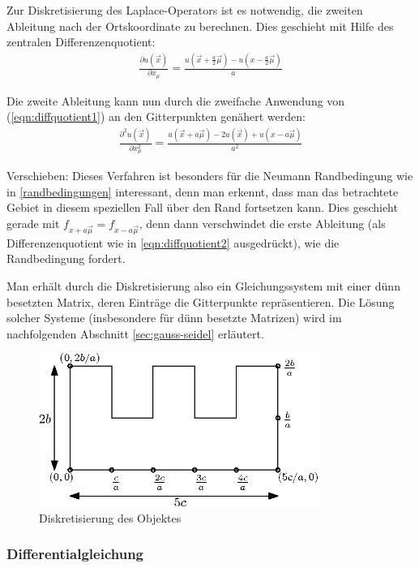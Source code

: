 \documentclass[10pt,a4paper]{article}
\begin{document}
Zur Diskretisierung des Laplace-Operators ist es notwendig, die zweiten Ableitung nach der Ortskoordinate zu berechnen. Dies geschieht mit Hilfe des zentralen Differenzenquotient:
\begin{align}
\frac{\partial u(\vec{x})}{\partial x_{\mu}}=\frac{u(\vec{x}+\frac{a}{2}\vec{\mu}) - u(x-\frac{a}{2}\vec{\mu})}{a}
\label{eqn:diffquotient1}
\end{align}

Die zweite Ableitung kann nun durch die zweifache Anwendung von (\ref{eqn:diffquotient1}) an den Gitterpunkten genähert werden:
\begin{align}
\frac{\partial^2 u(\vec{x})}{\partial x_{\mu}^2}=\frac{u(\vec{x}+a\vec{\mu})-2 u(\vec{x})+u(x-a\vec{\mu})}{a^2}
\label{eqn:diffquotient2}
\end{align}

Verschieben: Dieses Verfahren ist besonders für die Neumann Randbedingung wie in  \ref{randbedingungen} interessant, denn man erkennt, dass man das betrachtete Gebiet in diesem speziellen Fall über den Rand fortsetzen kann. Dies geschieht gerade mit $f_{x+a\vec{\mu}}=f_{x-a\vec{\mu}}$, denn dann verschwindet die erste Ableitung (als Differenzenquotient wie in \ref{eqn:diffquotient2} ausgedrückt), wie die Randbedingung fordert.

Man erhält durch die Diskretisierung also ein Gleichungssystem mit einer dünn besetzten Matrix, deren Einträge die Gitterpunkte repräsentieren. Die Lösung solcher Systeme (insbesondere für dünn besetzte Matrizen) wird im nachfolgenden Abschnitt \ref{sec:gauss-seidel} erläutert.

\begin{figure}[htbp!]
\centering
\includegraphics[height=5cm]{./figures/grid.eps}
\caption{Diskretisierung des Objektes}
\end{figure}

\subsubsection{Differentialgleichung}
\end{document}
